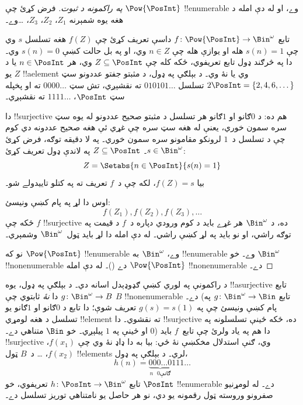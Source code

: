\documentclass[../../../include/open-logic-section]{subfiles}
\begin{document}
\begin{proof}[په راکمونه د {} ثبوت]
فرض کړئ چې $\Pow{\PosInt}$ !!{enumerable} وے، او له دې امله د
هغه يوه شمېرنه $Z_{1}$، $Z_{2}$، $Z_{3}$، \dots وے۔

تابع $f \colon \Pow{\PosInt} \to \Bin^\omega$ داسې تعريف کړئ
چې $f(Z)$ هغه تسلسل $s$ وي چې $s(n) = 1$ هله او يوازې هله
چې $n \in Z$ وي، او په بل حالت کښې $s(n) = 0$ وي۔
دا په څرګند ډول تابع تعريفوي، ځکه
کله چې $Z \subseteq \PosInt$ وي، هر $n \in \PosInt$ يا د $Z$
يو !!a{element} وي يا نۀ وي۔ د بېلګې په ډول، د مثبتو جفتو
عددونو سټ $2\PosInt = \{2, 4, 6, \dots\}$ تسلسل
$010101\dots$ ته نقشېږي، تش سټ $0000\dots$ ته او پخپله سټ
$\PosInt$، $1111\dots$ ته نقشېږي۔

دا !!{surjective} هم ده: د $0$ګانو او $1$ګانو هر تسلسل د مثبتو
صحيح عددونو له يوه سټ سره سمون خوري، يعنې له هغه سټ سره چې غړي
ئې هغه صحيح عددونه دي کوم چې د تسلسل د~$1$ لرونکو مقامونو سره
سمون خوري۔ په لا دقيقه توګه، فرض کړئ $s \in \Bin^\omega$۔
$Z \subseteq \PosInt$ په لاندې ډول تعريف کړئ:
\[
Z = \Setabs{n \in \PosInt}{s(n) = 1}
\]
بيا $f(Z) = s$، لکه چې د~$f$ تعريف ته په کتلو تاييدولے شو۔

اوس دا لړ په پام کښې ونيسئ:
\[
f(Z_1), f(Z_2), f(Z_3), \dots
\]
ځکه چې $f$ !!{surjective} ده، د $\Bin^\omega$ هر غړے بايد د
کوم ورودي دپاره د~$f$ د قيمت په توګه راشي، او نو بايد په لړ کښې
راشي۔ له دې امله دا لړ بايد ټول~$\Bin^\omega$ وشمېري۔

نو که $\Pow{\PosInt}$ !!{enumerable} وے، $\Bin^\omega$ به
!!{enumerable} وے۔ خو $\Bin^\omega$ !!{nonenumerable} دے
()۔ له دې امله
$\Pow{\PosInt}$ !!{nonenumerable} دے۔
\end{proof}

\begin{explain}
د راکمونې په لوري کښې ګډوډېدل اسانه دي۔ د بېلګې په ډول، يوه
!!a{surjective} تابع $g \colon \Bin^\omega \to B$ دا \emph{نۀ}
ثابتوي چې $B$ !!{nonenumerable} دے۔ (تابع
$g \colon \Bin^\omega \to \Bin$ په پام کښې ونيسئ چې په
$g(s) = s(1)$ تعريف شوې؛ دا تابع د $0$ګانو او $1$ګانو يو تسلسل
د هغه لومړي !!{element} ته نقشوي۔ دا !!{surjective} ده، ځکه ځينې
تسلسلونه په $0$ او ځينې په $1$ پيلېږي۔ خو $\Bin$ متناهي دے۔)
دا هم په ياد ولرئ چې تابع~$f$ بايد !!{surjective} وي، ګنې
استدلال مخکښې نۀ ځي: بيا به دا ډاډ نۀ وي چې $f(x_1)$، $f(x_2)$،
\dots{} د~$B$ ټول !!{element}s لري۔ د بېلګې په ډول،
\[
h(n) = \underbrace{000\dots0}_{\text{$n$ $0$ګانې}}111\dots
\]
تابع $h\colon \PosInt \to \Bin^\omega$ تعريفوي، خو $\PosInt$
!!{enumerable} دے۔
له لومړنيو صفرونو وروسته ټول رقمونه يو دي، نو هر حاصل
يو نامتناهي توريز تسلسل دے۔
\end{explain}
\end{document}
